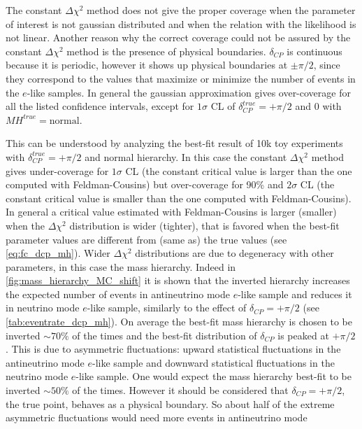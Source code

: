 The constant $\Delta \chi^2$ method does not give the proper coverage when the 
parameter of interest is not gaussian distributed and when the relation with the likelihood is not linear.
Another reason why the correct coverage could not be assured by the constant $\Delta \chi^2$
method is the presence of physical boundaries. 
$\delta_{CP}$ is continuous because it is periodic, however it shows up physical boundaries at $\pm \pi/2$,
since they correspond to the values that maximize or minimize the number of events in the
$e$-like samples. 
In general the gaussian approximation gives over-coverage for all the listed confidence intervals,
except for $1\sigma$ CL of $\delta^{true}_{CP} = +\pi/2$ and 0 with $MH^{true} = \text{normal}$.
\newline

This can be understood by analyzing the best-fit result of 10k toy experiments 
with $\delta^{true}_{CP} = +\pi/2$ and normal hierarchy.
In this case the constant $\Delta \chi^2$ method gives under-coverage for $1\sigma$ CL
(the constant critical value is larger than the one computed with Feldman-Cousins)
but over-coverage for 90\% and $2\sigma$ CL 
(the constant critical value is smaller than the one computed with Feldman-Cousins).
In general a critical value estimated with Feldman-Cousins is larger (smaller)
when the $\Delta \chi^2$ distribution is wider (tighter),
that is favored when the best-fit parameter values are different from (same as) the true values (see \cref{eq:fc_dcp_mh}). 
Wider $\Delta \chi^2$ distributions are due to degeneracy with other parameters, in this case the mass hierarchy.
Indeed in \cref{fig:mass_hierarchy_MC_shift} it is shown that the inverted hierarchy increases the expected
number of events in antineutrino mode $e$-like sample and reduces it in neutrino mode $e$-like sample,
similarly to the effect of $\delta_{CP} = +\pi/2$ (see \cref{tab:eventrate_dcp_mh}).
On average the best-fit mass hierarchy is chosen to be inverted $\sim 70\%$ of the times
and the best-fit distribution of $\delta_{CP}$ is peaked at $+\pi/2$.
This is due to asymmetric fluctuations: upward statistical fluctuations in the antineutrino mode $e$-like sample
and downward statistical fluctuations in the neutrino mode $e$-like sample.
One would expect the mass hierarchy best-fit to be inverted $\sim 50\%$ of the times.
However it should be considered that $\delta_{CP} = +\pi/2$, the true point, behaves as a physical boundary.
So about half of the extreme asymmetric fluctuations would need more events in antineutrino mode
